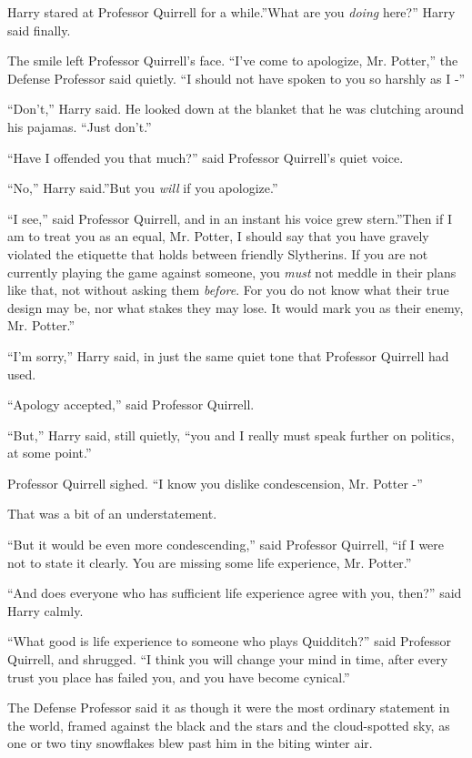 Harry stared at Professor Quirrell for a while.''What are you
\emph{doing} here?'' Harry said finally.

The smile left Professor Quirrell's face. ``I've come to apologize, Mr.
Potter,'' the Defense Professor said quietly. ``I should not have spoken
to you so harshly as I -''

``Don't,'' Harry said. He looked down at the blanket that he was
clutching around his pajamas. ``Just don't.''

``Have I offended you that much?'' said Professor Quirrell's quiet
voice.

``No,'' Harry said.''But you \emph{will} if you apologize.''

``I see,'' said Professor Quirrell, and in an instant his voice grew
stern.''Then if I am to treat you as an equal, Mr. Potter, I should say
that you have gravely violated the etiquette that holds between friendly
Slytherins. If you are not currently playing the game against someone,
you \emph{must} not meddle in their plans like that, not without asking
them \emph{before}. For you do not know what their true design may be,
nor what stakes they may lose. It would mark you as their enemy, Mr.
Potter.''

``I'm sorry,'' Harry said, in just the same quiet tone that Professor
Quirrell had used.

``Apology accepted,'' said Professor Quirrell.

``But,'' Harry said, still quietly, ``you and I really must speak
further on politics, at some point.''

Professor Quirrell sighed. ``I know you dislike condescension, Mr.
Potter -''

That was a bit of an understatement.

``But it would be even more condescending,'' said Professor Quirrell,
``if I were not to state it clearly. You are missing some life
experience, Mr. Potter.''

``And does everyone who has sufficient life experience agree with you,
then?'' said Harry calmly.

``What good is life experience to someone who plays Quidditch?'' said
Professor Quirrell, and shrugged. ``I think you will change your mind in
time, after every trust you place has failed you, and you have become
cynical.''

The Defense Professor said it as though it were the most ordinary
statement in the world, framed against the black and the stars and the
cloud-spotted sky, as one or two tiny snowflakes blew past him in the
biting winter air.

